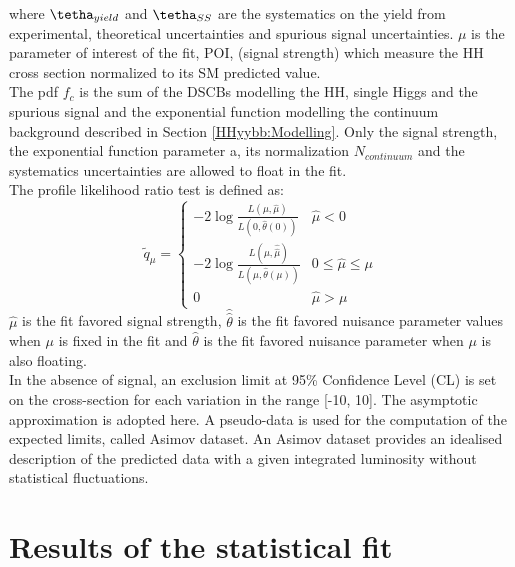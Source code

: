 where $\tetha_{yield}$ and $\tetha_{SS}$ are the systematics on the yield from experimental, theoretical uncertainties and spurious signal uncertainties. $\mu$ is the parameter of interest of the fit, POI, (signal strength) which measure the HH cross section normalized to its SM predicted value. \\
The pdf $f_c$ is the sum of the DSCBs modelling the HH, single Higgs and the spurious signal and the exponential function modelling the continuum background described in Section \ref{HHyybb:Modelling}. Only the signal strength, the exponential function parameter a, its normalization $N_{continuum}$ and the systematics uncertainties are allowed to float in the fit. \\
The profile likelihood ratio test is defined as: 
\begin{equation}
    \tilde{q}_{\mu}=\left\{\begin{array}{ll}
-2 \log \frac{L(\mu, \hat{\mu})}{L(0, \hat{\theta}(0))} & \hat{\mu}<0 \\
-2 \log \frac{L(\mu, \hat{\hat{\mu}})}{L(\hat{\mu}, \hat{\theta}(\mu))} & 0 \leq \hat{\mu} \leq \mu \\
0 & \hat{\mu}>\mu
\end{array}\right.
\end{equation}
$\hat{\mu}$ is the fit favored signal strength, $\hat{\hat{\theta}}$ is the fit favored nuisance parameter values when $\mu$ is fixed in the fit and $\hat{\theta}$ is the fit favored nuisance parameter when $\mu$ is also floating. \\
In the absence of signal, an exclusion limit at 95\% Confidence Level (CL) is set on the \HHyybb cross-section for each \kl variation in the range [-10, 10]. The asymptotic approximation \cite{Z} is adopted here. A pseudo-data is used for the computation of the expected limits, called Asimov dataset. An Asimov dataset provides an idealised description of the predicted data with a given integrated luminosity without statistical fluctuations.

\section{Results of the statistical fit}
\label{HHyybb:Results}

